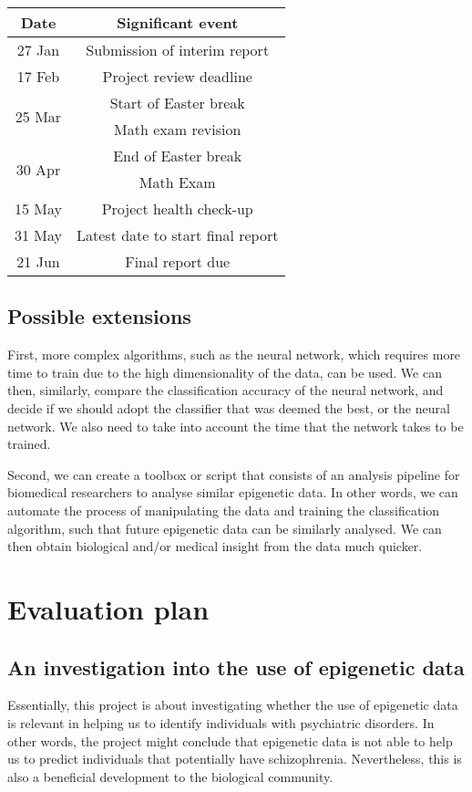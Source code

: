 \documentclass[12pt, twoside, a4paper]{article}
\begin{document}
\begin{center}
    \begin{tabular}{ | c | c |}
    \hline
    Date & Significant event \\ \hline \hline
    27 Jan & Submission of interim report \\ \hline
    17 Feb & Project review deadline \\ \hline
    \multirow{2}{*}{25 Mar} & Start of Easter break \\
    & Math exam revision \\ \hline
    \multirow{2}{*}{30 Apr} & End of Easter break \\
     & Math Exam \\ \hline
    15 May & Project health check-up \\ \hline
    31 May & Latest date to start final report \\ \hline
    21 Jun & Final report due \\
    \hline
    \end{tabular}
\end{center}

\subsection{Possible extensions}
First, more complex algorithms, such as the neural network, which requires more time to train due to the high dimensionality of the data, can be used. We can then, similarly, compare the classification accuracy of the neural network, and decide if we should adopt the classifier that was deemed the best, or the neural network. We also need to take into account the time that the network takes to be trained.

Second, we can create a toolbox or script that consists of an analysis pipeline for biomedical researchers to analyse similar epigenetic data. In other words, we can automate the process of manipulating the data and training the classification algorithm, such that future epigenetic data can be similarly analysed. We can then obtain biological and/or medical insight from the data much quicker.

\section{Evaluation plan}
\subsection{An investigation into the use of epigenetic data}
Essentially, this project is about investigating whether the use of epigenetic data is relevant in helping us to identify individuals with psychiatric disorders. In other words, the project might conclude that epigenetic data is not able to help us to predict individuals that potentially have schizophrenia. Nevertheless, this is also a beneficial development to the biological community.
\end{document}
